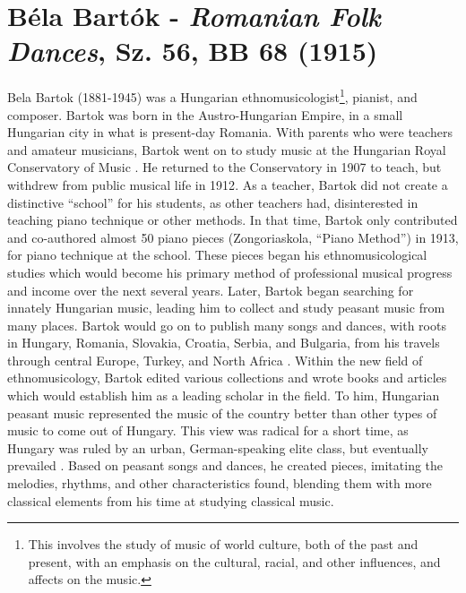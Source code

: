 \chapter[Bartók's \textit{Romanian Folk Dances}, Sz. 56, BB 68]{Béla Bartók - \textit{Romanian Folk Dances}, Sz. 56, BB 68 (1915)}

Bela Bartok (1881-1945) was a Hungarian ethnomusicologist\footnote{This involves the study of music of world culture, both of the past and present, with an emphasis on the cultural, racial, and other influences, and affects on the music.}, pianist, and composer. Bartok was born in the Austro-Hungarian Empire, in a small Hungarian city in what is present-day Romania. With parents who were teachers and amateur musicians, Bartok went on to study music at the Hungarian Royal Conservatory of Music \autocite{Burkholder_Grout_Palisca_2014}. He returned to the Conservatory in 1907 to teach, but withdrew from public musical life in 1912\autocite{Gillies}. As a teacher, Bartok did not create a distinctive ``school'' for his students, as other teachers had, disinterested in teaching piano technique or other methods. In that time, Bartok only contributed and co-authored almost 50 piano pieces (Zongoriaskola, ``Piano Method'') in 1913, for piano technique at the school\autocite{Gillies}. These pieces began his ethnomusicological studies which would become his primary method of professional musical progress and income over the next several years. Later, Bartok began searching for innately Hungarian music, leading him to collect and study peasant music from many places. Bartok would go on to publish many songs and dances, with roots in Hungary, Romania, Slovakia, Croatia, Serbia, and Bulgaria, from his travels through central Europe, Turkey, and North Africa \autocite{Burkholder_Grout_Palisca_2014}. Within the new field of ethnomusicology, Bartok edited various collections and wrote books and articles which would establish him as a leading scholar in the field. To him, Hungarian peasant music represented the music of the country better than other types of music to come out of Hungary. This view was radical for a short time, as Hungary was ruled by an urban, German-speaking elite class, but eventually prevailed \autocite{Burkholder_Grout_Palisca_2014}. Based on peasant songs and dances, he created pieces, imitating the melodies, rhythms, and other characteristics found, blending them with more classical elements from his time at studying classical music. 

